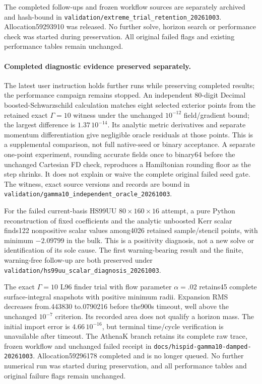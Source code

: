 \documentclass[11pt]{article}
\begin{document}
The completed follow-ups and frozen workflow sources are separately archived
and hash-bound in \nolinkurl{validation/extreme_trial_retention_20261003}.
Allocation59293910 was released. No further solve, horizon search or
performance check was started during preservation. All original failed
flags and existing performance tables remain unchanged.
\paragraph{Completed diagnostic evidence preserved separately.}
The latest user instruction holds further runs while preserving completed
results; the performance campaign remains stopped. An independent
80-digit Decimal boosted-Schwarzschild calculation matches eight selected
exterior points from the retained exact $\Gamma=10$ witness under the unchanged
$10^{-12}$ field/gradient bound; the largest difference is $1.37\,10^{-14}$.
Its analytic metric derivatives and separate momentum differentiation give
negligible oracle residuals at those points. This is a supplemental comparison,
not full native-seed or binary acceptance. A separate one-point experiment,
rounding accurate fields once to binary64 before the unchanged Cartesian FD
check, reproduces a Hamiltonian rounding floor as the step shrinks.
It does not explain or waive the complete original failed seed gate.
The witness, exact source versions and records are bound in
\nolinkurl{validation/gamma10_independent_oracle_20261003}.

For the failed current-basis HS99UU $80\times160\times16$ attempt, a pure
Python reconstruction of fixed coefficients and the analytic unboosted Kerr
scalar finds122 nonpositive scalar values among4026 retained sample/stencil
points, with minimum $-2.09799$ in the bulk. This is a positivity diagnosis,
not a new solve or identification of its sole cause. The first warning-bearing
result and the finite, warning-free follow-up are both preserved under
\nolinkurl{validation/hs99uu_scalar_diagnosis_20261003}.

The exact $\Gamma=10$ L96 finder trial with flow parameter $\alpha=.02$
retains45 complete surface-integral snapshots with positive minimum radii.
Expansion RMS decreases from.443830 to.0790216 before the900s timeout,
well above the unchanged $10^{-7}$ criterion. Its recorded area does not
qualify a horizon mass. The initial import error is $4.66\,10^{-16}$,
but terminal time/cycle verification is unavailable after timeout.
The AthenaK branch retains its complete raw trace, frozen workflow and
unchanged failed receipt in
\nolinkurl{docs/hispid-gamma10-damped-20261003}.
Allocation59296178 completed and is no longer queued. No further numerical
run was started during preservation, and all performance tables and original
failure flags remain unchanged.
\end{document}
